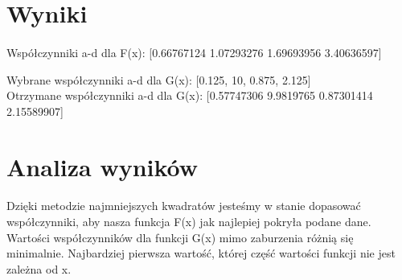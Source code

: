 \documentclass{article}
\begin{document}
\newpage
\section{Wyniki}


\paragraph{}

\begingroup\centering
\paragraph{}
Współczynniki a-d dla F(x): [0.66767124 1.07293276 1.69693956 3.40636597]

\newpage
Wybrane współczynniki a-d dla G(x): [0.125, 10, 0.875, 2.125] \\
Otrzymane współczynniki a-d dla G(x): [0.57747306 9.9819765  0.87301414 2.15589907]


\endgroup




\section{Analiza wyników}
\paragraph{}
Dzięki metodzie najmniejszych kwadratów jesteśmy w stanie dopasować współczynniki, aby nasza funkcja F(x) jak najlepiej
pokryła podane dane. Wartości współczynników dla funkcji G(x) mimo zaburzenia różnią się minimalnie. Najbardziej pierwsza wartość, której część wartości funkcji nie jest zależna od x.



\vfill {}
\end{document}
